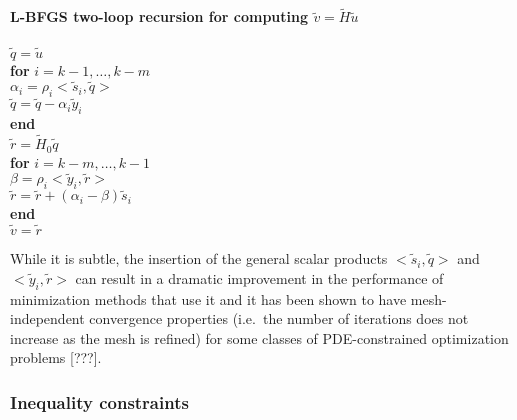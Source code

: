 \bifthen
\textbf{L-BFGS two-loop recursion for computing $\tilde{v} = \tilde{H} \tilde{u}$} \\
\\
$\tilde{q} = \tilde{u}$ \\
\textbf{for} $i = k-1, \ldots , k-m$ \\
\> $\alpha_i = \rho_i <\tilde{s}_i,\tilde{q}>$ \\
\> $\tilde{q} = \tilde{q} - \alpha_i \tilde{y}_i$ \\
\textbf{end} \\
$\tilde{r} = \tilde{H}_0 \tilde{q}$ \\
\textbf{for} $i = k-m, \ldots , k-1$ \\
\> $\beta = \rho_i <\tilde{y}_i,\tilde{r}>$ \\
\> $\tilde{r} = \tilde{r} + (\alpha_i - \beta) \tilde{s}_i$ \\
\textbf{end} \\
$\tilde{v} = \tilde{r}$
\eifthen

While it is subtle, the insertion of the general scalar products
$<\tilde{s}_i,\tilde{q}>$ and $<\tilde{y}_i,\tilde{r}>$ can result in a
dramatic improvement in the performance of minimization methods that use it
and it has been shown to have mesh-independent convergence properties (i.e.\
the number of iterations does not increase as the mesh is refined) for some
classes of PDE-constrained optimization problems [???].

\subsubsection{Inequality constraints}

